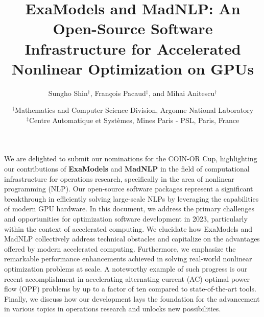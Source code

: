 
\usepackage{wrapfig}
\title{ExaModels and MadNLP: An Open-Source Software Infrastructure for Accelerated Nonlinear Optimization on GPUs}
\author{Sungho Shin$^\dag$, François Pacaud$^\ddag$, and Mihai Anitescu$^\dag$}
\date{\small
  $^\dag$Mathematics and Computer Science Division, Argonne National Laboratory\\
  $^\ddag$Centre Automatique et Systèmes, Mines Paris - PSL, Paris, France
}

\maketitle

We are delighted to submit our nominations for the COIN-OR Cup,
highlighting our contributions of {\bf ExaModels} \cite{examodels} and
{\bf MadNLP} \cite{madnlp} in the field of computational
infrastructure for operations research, specifically in the area of
nonlinear programming (NLP). Our open-source software packages
represent a significant breakthrough in efficiently solving
large-scale NLPs by leveraging the capabilities of modern GPU
hardware.  In this document, we address the primary challenges and
opportunities for optimization software development in 2023,
particularly within the context of accelerated computing. We elucidate
how ExaModels and MadNLP collectively address technical obstacles and
capitalize on the advantages offered by modern accelerated
computing. Furthermore, we emphasize the remarkable performance
enhancements achieved in solving real-world nonlinear optimization
problems at scale. A noteworthy example of such progress is our recent
accomplishment in accelerating alternating current (AC) optimal power
flow (OPF) problems by up to a factor of ten compared to state-of-the-art
tools. Finally, we discuss how our development lays the foundation for
the advancement in various topics in operations research and unlocks
new possibilities.

